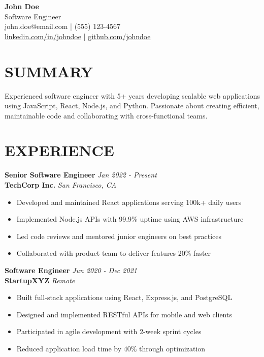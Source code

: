 \documentclass[11pt,a4paper]{article}
\begin{document}
\begin{center}
{\Large \textbf{John Doe}}\\
\vspace{2pt}
Software Engineer\\
john.doe@email.com | (555) 123-4567\\
\url{linkedin.com/in/johndoe} | \url{github.com/johndoe}
\end{center}

\section{SUMMARY}
Experienced software engineer with 5+ years developing scalable web applications using JavaScript, React, Node.js, and Python. Passionate about creating efficient, maintainable code and collaborating with cross-functional teams.

\section{EXPERIENCE}

\textbf{Senior Software Engineer} \hfill \textit{Jan 2022 - Present}\\
\textbf{TechCorp Inc.} \hfill \textit{San Francisco, CA}
\begin{itemize}
\item Developed and maintained React applications serving 100k+ daily users
\item Implemented Node.js APIs with 99.9\% uptime using AWS infrastructure
\item Led code reviews and mentored junior engineers on best practices
\item Collaborated with product team to deliver features 20\% faster
\end{itemize}

\textbf{Software Engineer} \hfill \textit{Jun 2020 - Dec 2021}\\
\textbf{StartupXYZ} \hfill \textit{Remote}
\begin{itemize}
\item Built full-stack applications using React, Express.js, and PostgreSQL
\item Designed and implemented RESTful APIs for mobile and web clients
\item Participated in agile development with 2-week sprint cycles
\item Reduced application load time by 40\% through optimization
\end{itemize}
\end{document}
